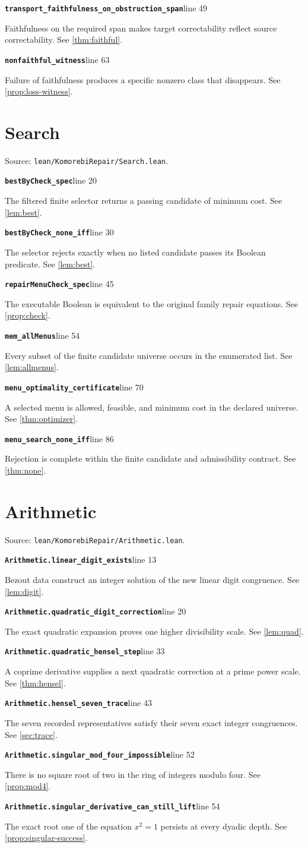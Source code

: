 \documentclass[11pt,letterpaper,oneside,openany]{book}
\theoremstyle{quiet}
\newcommand{\record}[3]{\noindent\begin{minipage}{\linewidth}\small\textbf{\nolinkurl{#1}}\hfill\textsf{line #2}\par\smallskip #3\end{minipage}\par\vspace{7pt}}
\newcommand{\moduleheading}[2]{\section{#1}\label{#2}\noindent\small Source: \nolinkurl{lean/KomorebiRepair/#1.lean}.\normalsize\par}
\begin{document}
\record{transport_faithfulness_on_obstruction_span}{49}{Faithfulness on the required span makes target correctability reflect source correctability. See \cref{thm:faithful}.}

\record{nonfaithful_witness}{63}{Failure of faithfulness produces a specific nonzero class that disappears. See \cref{prop:loss-witness}.}

\moduleheading{Search}{reg:Search}

\record{bestByCheck_spec}{20}{The filtered finite selector returns a passing candidate of minimum cost. See \cref{lem:best}.}

\record{bestByCheck_none_iff}{30}{The selector rejects exactly when no listed candidate passes its Boolean predicate. See \cref{lem:best}.}

\record{repairMenuCheck_spec}{45}{The executable Boolean is equivalent to the original family repair equations. See \cref{prop:check}.}

\record{mem_allMenus}{54}{Every subset of the finite candidate universe occurs in the enumerated list. See \cref{lem:allmenus}.}

\record{menu_optimality_certificate}{70}{A selected menu is allowed, feasible, and minimum cost in the declared universe. See \cref{thm:optimizer}.}

\record{menu_search_none_iff}{86}{Rejection is complete within the finite candidate and admissibility contract. See \cref{thm:none}.}

\moduleheading{Arithmetic}{reg:Arithmetic}

\record{Arithmetic.linear_digit_exists}{13}{Bezout data construct an integer solution of the new linear digit congruence. See \cref{lem:digit}.}

\record{Arithmetic.quadratic_digit_correction}{20}{The exact quadratic expansion proves one higher divisibility scale. See \cref{lem:quad}.}

\record{Arithmetic.quadratic_hensel_step}{33}{A coprime derivative supplies a next quadratic correction at a prime power scale. See \cref{thm:hensel}.}

\record{Arithmetic.hensel_seven_trace}{43}{The seven recorded representatives satisfy their seven exact integer congruences. See \cref{sec:trace}.}

\record{Arithmetic.singular_mod_four_impossible}{52}{There is no square root of two in the ring of integers modulo four. See \cref{prop:mod4}.}

\record{Arithmetic.singular_derivative_can_still_lift}{54}{The exact root one of the equation $x^2=1$ persists at every dyadic depth. See \cref{prop:singular-success}.}
\end{document}
